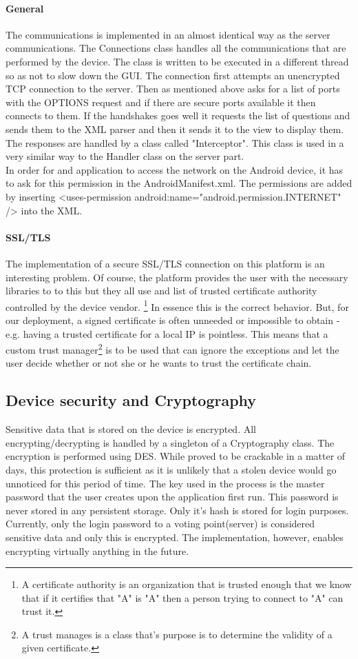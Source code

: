 \documentclass[11pt,twoside,a4paper]{book}
\begin{document}
\paragraph{General}The communications is implemented in an almost identical way as the server communications. The Connections class handles all the communications that are performed by the device. The class is written to be executed in a different thread so as not to slow down the GUI. The connection first attempts an unencrypted TCP connection to the server. Then as mentioned above asks for a list of ports with the OPTIONS request and if there are secure ports available it then connects to them. If the handshakes goes well it requests the list of questions and sends them to the XML parser and then it sends it to the view to display them. The responses are handled by a class called "Interceptor". This class is used in a very similar way to the Handler class on the server part.\\
In order for and application to access the network on the Android device, it has to ask for this permission in the AndroidManifest.xml. The permissions are added by inserting <uses-permission android:name="android.permission.INTERNET" /> into the XML.
\paragraph{SSL/TLS}
The implementation of a secure SSL/TLS connection on this platform is an interesting problem. Of course, the platform provides the user with the necessary libraries to to this but they all use and  list of trusted certificate authority controlled by the device vendor. \footnote{A certificate authority is an organization that is trusted enough that we know that if it certifies that "A" is "A" then a person trying to connect to "A" can trust it.} In essence this is the correct behavior. But, for our deployment, a signed certificate is often unneeded or impossible to obtain - e.g. having a trusted certificate for a local IP is pointless. This means that a custom trust manager\footnote{A trust manages is a class that's purpose is to determine the validity of a given certificate.}  is to be used that can ignore the exceptions and let the user decide whether or not she or he wants to trust the certificate chain.
\subsection{Device security and Cryptography}
Sensitive data that is stored on the device is encrypted. All encrypting/decrypting is handled by a singleton of a Cryptography class. The encryption is performed using DES\cite{des}. While proved to be crackable in a matter of days, this protection is sufficient as it is unlikely that a stolen device would go unnoticed for this period of time.  The key used in the process is the master password that the user creates upon the application first run. This password is never stored in any persistent storage. Only it's hash is stored for login purposes.	 Currently, only the login password to a voting point(server)  is considered sensitive data and only this is encrypted. The implementation, however, enables encrypting virtually anything in the future.
\end{document}
